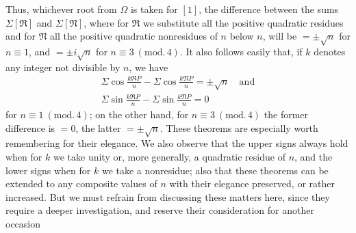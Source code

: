 Thus, whichever root from \(\Omega\) is taken for \([1]\), the difference between the sums \(\Sigma[\mathfrak R]\) and \(\Sigma[\mathfrak N]\), where for \(\mathfrak R\) we substitute all the positive quadratic residues and for \(\mathfrak N\) all the positive quadratic nonresidues of \(n\) below \(n\), will be \(=\pm\surd n\) for \(n\equiv1\), and \(=\pm i\surd n\) for \(n\equiv3\ (\mathrm{mod.}\,4)\). It also follows easily that, if \(k\) denotes any integer not divisible by \(n\), we have \[\begin{gathered}\Sigma\cos\frac{k\mathfrak RP}{n}-\Sigma\cos\frac{k\mathfrak NP}{n}=\pm\surd n\quad\text{and}\\\Sigma\sin\frac{k\mathfrak RP}{n}-\Sigma\sin\frac{k\mathfrak NP}{n}=0\end{gathered}\] for \(n\equiv1\ (\mathrm{mod.}\,4)\); on the other hand, for \(n\equiv3\ (\mathrm{mod.}\,4)\) the former difference is \(=0\), the latter
\(=\pm\surd n\). These theorems are especially worth remembering for their elegance. We also observe that the upper signs always hold when for \(k\) we take unity or, more generally, a quadratic residue of \(n\), and the lower signs when for \(k\) we take a nonresidue; also that these theorems can be extended to any composite values of \(n\) with their elegance preserved, or rather increased. But we must refrain from discussing these matters here, since they require a deeper investigation, and reserve their consideration for another occasion

